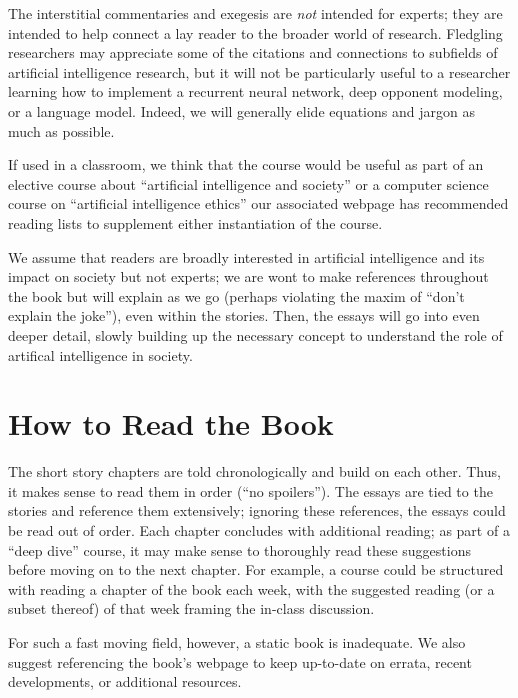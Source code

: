 The interstitial commentaries and exegesis are \emph{not} intended for experts; they are intended to help connect a lay reader to the broader world of research.  Fledgling researchers may appreciate some of the citations and connections to subfields of artificial intelligence research, but it will not be particularly useful to a researcher learning how to implement a recurrent neural network, deep opponent modeling, or a language model.  Indeed, we will generally elide equations and jargon as much as possible.

If used in a classroom, we think that the course would be useful as part of an elective course about ``artificial intelligence and society'' or a computer science course on ``artificial intelligence ethics'' our associated webpage has recommended reading lists to supplement either instantiation of the course.

We assume that readers are broadly interested in artificial intelligence and its impact on society but not experts; we are wont to make references throughout the book but will explain as we go (perhaps violating the maxim of ``don't explain the joke''), even within the stories.  Then, the essays will go into even deeper detail, slowly building up the necessary concept to understand the role of artifical intelligence in society.

\section{How to Read the Book}

The short story chapters are told chronologically and build on each other.  Thus, it makes sense to read them in order (``no spoilers'').  The essays are tied to the stories and reference them extensively; ignoring these references, the essays could be read out of order.  Each chapter concludes with additional reading; as part of a ``deep dive'' course, it may make sense to thoroughly read these suggestions before moving on to the next chapter.  For example, a course could be structured with reading a chapter of the book each week, with the suggested reading (or a subset thereof) of that week framing the in-class discussion.

For such a fast moving field, however, a static book is inadequate.  We also suggest referencing the book's webpage to keep up-to-date on errata, recent developments, or additional resources.
